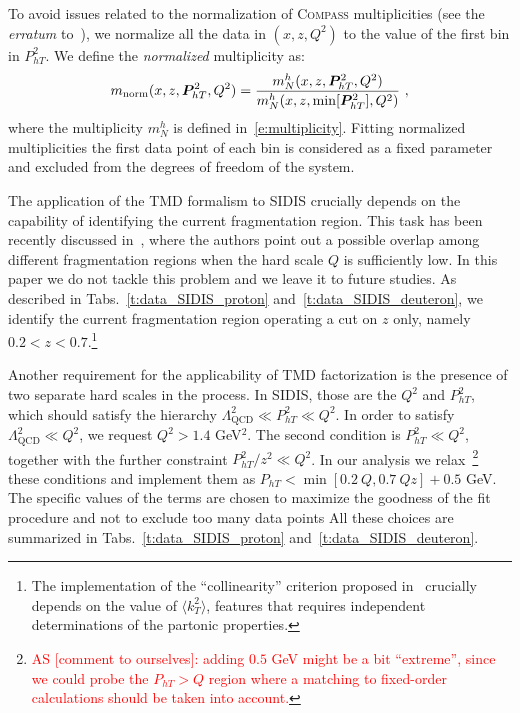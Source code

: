 \documentclass[aps,preprintnumbers,showpacs,nofootinbib,superscriptaddress,floatfix]{revtex4}
\newcommand{\compass}{\textsc{Compass }}
\newcommand{\Tperp}{T}
\begin{document}
To avoid issues related to the normalization of \compass multiplicities (see the {\em erratum} to~\cite{Adolph:2013stb}), we normalize all the data in $(x,z,Q^2)$ to the value of the first bin in $P_{h\Tperp}^2$. We define the {\em normalized} multiplicity as:
\begin{equation}
m_{\text{norm}}(x,z,\bm{P}_{h\Tperp}^2, Q^2) = \frac{m_N^h(x,z,\bm{P}_{h\Tperp}^2, Q^2)}{m_N^h (x,z,{\rm \min}[\bm{P}_{h\Tperp}^2], Q^2)} \ ,
\label{e:mult_norm}
\end{equation}
where the multiplicity $m_N^h$ is defined in~\eqref{e:multiplicity}. Fitting normalized multiplicities the first data point of each bin is considered as a fixed parameter and excluded from the degrees of freedom of the system.

The application of the TMD formalism to SIDIS crucially depends on the capability of identifying the current fragmentation region. This task has been recently discussed in~\cite{Boglione:2016bph}, where the authors point out a possible overlap among different  fragmentation regions when the hard scale $Q$ is sufficiently low. 
In this paper we do not tackle this problem and we leave it to future studies. As described in Tabs.~\ref{t:data_SIDIS_proton} and~\ref{t:data_SIDIS_deuteron}, we identify the current fragmentation region operating a cut on $z$ only, namely $0.2 < z < 0.7$.\footnote{The implementation of the ``collinearity'' criterion proposed in~\cite{Boglione:2016bph} crucially depends on the value of $\langle k_T^2 \rangle$, features that requires independent determinations of the partonic properties.}

Another requirement for the applicability of TMD factorization is the presence of two separate hard scales in the process. In SIDIS, those are the $Q^2$ and $P_{hT}^2$, which should satisfy the hierarchy $\Lambda_{\text{QCD}}^2 \ll P_{hT}^2 \ll Q^2$. 
In order to satisfy $\Lambda_{\text{QCD}}^2 \ll Q^2$, we request $Q^2 > 1.4$ GeV$^2$. 
The second condition is $P_{hT}^2 \ll Q^2$, together with the further constraint  $P_{hT}^2/z^2 \ll Q^2$. In our analysis we relax~\footnote{\textcolor{red}{AS [comment to ourselves]: adding $0.5$ GeV might be a bit ``extreme'', since we could probe the $P_{hT} > Q$ region where a matching to fixed-order calculations should be taken into account.}} these conditions and implement them as $P_{hT} < \min[0.2\ Q, 0.7\ Qz] + 0.5$ GeV. The specific values of the terms are chosen to maximize the goodness of the fit procedure and not to exclude too many data points
All these choices are summarized in Tabs.~\ref{t:data_SIDIS_proton} and~\ref{t:data_SIDIS_deuteron}.
\end{document}
